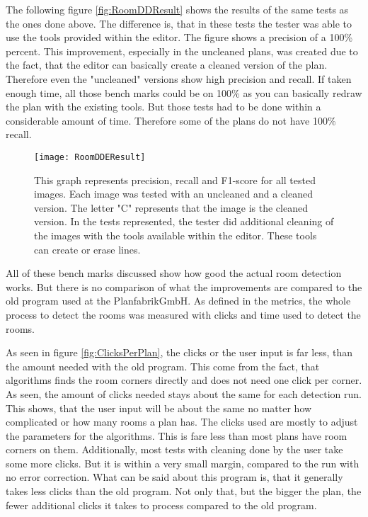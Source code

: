 The following figure \ref{fig:RoomDDResult} shows the results of the same tests as the ones done above. The difference is, that in these tests the tester was able to use the tools provided within the editor. The figure shows a precision of a 100\% percent. This improvement, especially in the uncleaned plans, was created due to the fact, that the editor can basically create a cleaned version of the plan. Therefore even the "uncleaned" versions show high precision and recall. If taken enough time, all those bench marks could be on 100\% as you can basically redraw the plan with the existing tools. But those tests had to be done within a considerable amount of time. Therefore some of the plans do not have 100\% recall.

\begin{figure}[H]
	\centering
	\texttt{[image: RoomDDEResult]}
	\caption{This graph represents precision, recall and F1-score for all tested images. Each image was tested with an uncleaned and a cleaned version. The letter "C" represents that the image is the cleaned version. In the tests represented, the tester did additional cleaning of the images with the tools available within the editor. These tools can create or erase lines. }
	\label{fig:RoomDDEResult}
\end{figure}

All of these bench marks discussed show how good the actual room detection works. But there is no comparison of what the improvements are compared to the old program used at the PlanfabrikGmbH. As defined in the metrics, the whole process to detect the rooms was measured with clicks and time used to detect the rooms.

As seen in figure \ref{fig:ClicksPerPlan}, the clicks or the user input is far less, than the amount needed with the old program. This come from the fact, that algorithms finds the room corners directly and does not need one click per corner. As seen, the amount of clicks needed stays about the same for each detection run. This shows, that the user input will be about the same no matter how complicated or how many rooms a plan has. The clicks used are mostly to adjust the parameters for the algorithms. This is fare less than most plans have room corners on them. Additionally, most tests with cleaning done by the user take some more clicks. But it is within a very small margin, compared to the run with no error correction. What can be said about this program is, that it generally takes less clicks than the old program. Not only that, but the bigger the plan, the fewer additional clicks it takes to process compared to the old program. 

